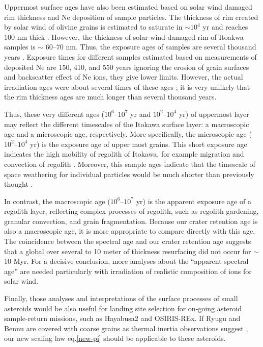 \documentclass[3p,authoryear]{elsarticle}
\begin{document}
Uppermost surface ages have also been estimated based on solar wind damaged rim thickness and Ne deposition of sample particles. The thickness of rim created by solar wind of olivine grains is estimated to saturate in $\sim 10^4$ yr and reaches 100 nm thick \citep{keller2016}. However, the thickness of solar-wind-damaged rim of Itoakwa samples is $\sim$ 60--70 nm. Thus, the exposure ages of samples are several thousand years \citep{berger2015}. Exposure times for different samples estimated based on measurements of deposited Ne are 150, 410, and 550 years ignoring the erosion of grain surfaces and backscatter effect of Ne ions, they give lower limits. However, the actual irradiation ages were about several times of these ages \citep{nagao2011}; it is very unlikely that the rim thickness ages are much longer than several thousand years.

Thus, these very different ages ($10^6$--$10^7$ yr and $10^2$--$10^4$ yr) of uppermost layer may reflect the different timescales of the Itokawa surface layer: a macroscopic age and a microscopic age, respectively.
More specifically, the microscopic age ($10^2$--$10^4$ yr) is the exposure age of upper most grains. This short exposure age indicates the high mobility of regolith of Itokawa, for example migration and convection of regolith \citep[e.g.,][]{miyamoto2007}. Moreover, this sample ages indicate that the timescale of space weathering for individual particles would be much shorter than previously thought \citep{strazzulla2005}.

In contrast, the macroscopic age ($10^6$--$10^7$ yr) is the apparent exposure age of a regolith layer, reflecting complex processes of regolith, such as regolith gardening, granular convection, and grain fragmentation. Because our crater retention age is also a macroscopic age, it is more appropriate to compare directly with this age. The coincidence between the spectral age and our crater retention age suggests that a global over several to 10 meter of thickness resurfacing did not occur for $\sim$10 Myr. For a decisive conclusion, more analyses about the ``apparent spectral age'' are needed particularly with irradiation of realistic composition of ions for solar wind. 

Finally, those analyses and interpretations of the surface processes of small asteroids would be also useful for landing site selection for on-going asteroid sample-return missions, such as Hayabusa2 and OSIRIS-REx.
If Ryugu and Bennu are covered with coarse grains as thermal inertia observations suggest \citep{hasegawa2008, emery2014,mueller2016}, our new scaling law eq.\eqref{new-pi} should be applicable to these asteroids. 
\end{document}
